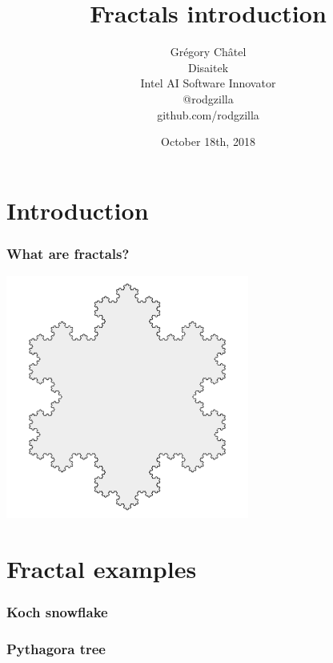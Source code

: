 \documentclass[10pt]{beamer}
\title{Fractals introduction}
\author[G. Châtel]{Grégory Châtel\\\vspace{0.3cm}Disaitek\\Intel AI Software Innovator\\\vspace{0.3cm}@rodgzilla\\github.com/rodgzilla}
\date{October 18th, 2018}
\begin{document}
\begin{frame}

  \maketitle

\end{frame}

\section{Introduction}

\begin{frame}

  \frametitle{What are fractals?}

  \begin{center}
    \includegraphics[width = 8cm]{images/koch_snowflake.png}
  \end{center}

\end{frame}

\section{Fractal examples}

\begin{frame}
  \frametitle{Koch snowflake}

\end{frame}

\begin{frame}
  \frametitle{Pythagora tree}

\end{frame}
\end{document}
